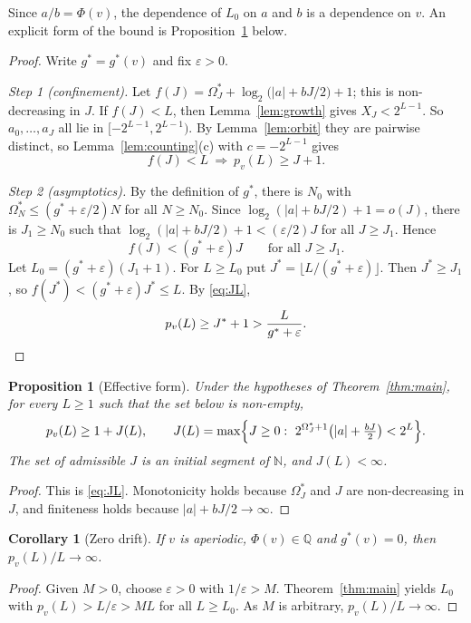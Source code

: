 \documentclass[11pt]{amsart}
\newtheorem{proposition}[theorem]{Proposition}
\newtheorem{corollary}[theorem]{Corollary}
\theoremstyle{definition}
\theoremstyle{remark}
\newcommand{\Q}{\mathbb{Q}}
\newcommand{\N}{\mathbb{N}}
\newcommand{\gs}{g^{*}}
\newcommand{\Om}{\Omega^{*}}
\begin{document}
Since $a/b=\Phi(v)$, the dependence of $L_0$ on $a$ and $b$ is a dependence on $v$. An explicit form of the bound is Proposition~\ref{prop:effective} below.

\begin{proof}
Write $\gs=\gs(v)$ and fix $\varepsilon>0$.

\emph{Step 1 (confinement).} Let $f(J)=\Om_J+\log_2\bigl(|a|+bJ/2\bigr)+1$; this is non-decreasing in $J$. If $f(J)<L$, then Lemma~\ref{lem:growth} gives $X_J<2^{L-1}$. So $a_0,\dots,a_J$ all lie in $[-2^{L-1},2^{L-1})$. By Lemma~\ref{lem:orbit} they are pairwise distinct, so Lemma~\ref{lem:counting}(c) with $c=-2^{L-1}$ gives
\begin{equation}\label{eq:JL}
f(J)<L\ \Longrightarrow\ p_v(L)\ge J+1 .
\end{equation}

\emph{Step 2 (asymptotics).} By the definition of $\gs$, there is $N_0$ with $\Om_N\le(\gs+\varepsilon/2)N$ for all $N\ge N_0$. Since $\log_2(|a|+bJ/2)+1=o(J)$, there is $J_1\ge N_0$ such that $\log_2(|a|+bJ/2)+1<(\varepsilon/2)J$ for all $J\ge J_1$. Hence
\[
f(J)<(\gs+\varepsilon)J\qquad\text{for all } J\ge J_1.
\]
Let $L_0=(\gs+\varepsilon)(J_1+1)$. For $L\ge L_0$ put $J^{*}=\lfloor L/(\gs+\varepsilon)\rfloor$. Then $J^{*}\ge J_1$, so $f(J^{*})<(\gs+\varepsilon)J^{*}\le L$. By \eqref{eq:JL},
\[
p_v(L)\ge J^{*}+1>\frac{L}{\gs+\varepsilon}.\qedhere
\]
\end{proof}

\begin{proposition}[Effective form]\label{prop:effective}
Under the hypotheses of Theorem~\ref{thm:main}, for every $L\ge1$ such that the set below is non-empty,
\[
p_v(L)\ge 1+J(L),\qquad J(L)=\max\Bigl\{J\ge0:\ 2^{\Om_J+1}\bigl(|a|+\tfrac{bJ}{2}\bigr)<2^L\Bigr\}.
\]
The set of admissible $J$ is an initial segment of $\N$, and $J(L)<\infty$.
\end{proposition}

\begin{proof}
This is \eqref{eq:JL}. Monotonicity holds because $\Om_J$ and $J$ are non-decreasing in $J$, and finiteness holds because $|a|+bJ/2\to\infty$.
\end{proof}

\begin{corollary}[Zero drift]\label{cor:zero}
If $v$ is aperiodic, $\Phi(v)\in\Q$ and $\gs(v)=0$, then $p_v(L)/L\to\infty$.
\end{corollary}

\begin{proof}
Given $M>0$, choose $\varepsilon>0$ with $1/\varepsilon>M$. Theorem~\ref{thm:main} yields $L_0$ with $p_v(L)>L/\varepsilon>ML$ for all $L\ge L_0$. As $M$ is arbitrary, $p_v(L)/L\to\infty$.
\end{proof}
\end{document}
